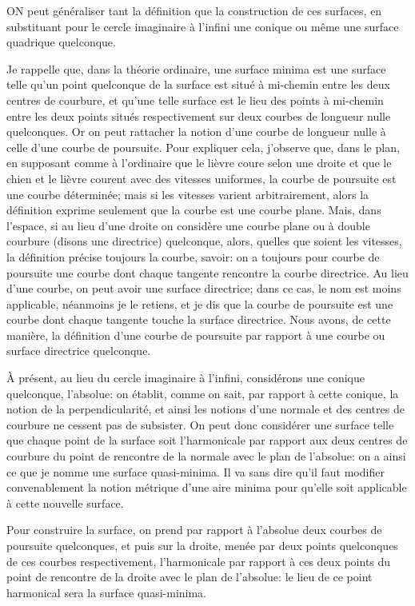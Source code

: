 \documentclass[11pt,a4paper]{article}
\begin{document}
\noindent ON peut généraliser tant la définition que la construction de ces surfaces, en substituant pour le cercle imaginaire à l'infini une conique ou même une surface quadrique quelconque.

Je rappelle que, dans la théorie ordinaire, une surface minima est une surface telle qu'un point quelconque de la surface est situé à mi-chemin entre les deux centres de courbure, et qu'une telle surface est le lieu des points à mi-chemin entre les deux points situés respectivement sur deux courbes de longueur nulle quelconques. Or on peut rattacher la notion d'une courbe de longueur nulle à celle d'une courbe de poursuite. Pour expliquer cela, j'observe que, dans le plan, en supposant comme à l'ordinaire que le lièvre coure selon une droite et que le chien et le lièvre courent avec des vitesses uniformes, la courbe de poursuite est une courbe déterminée; mais si les vitesses varient arbitrairement, alors la définition exprime seulement que la courbe est une courbe plane. Mais, dans l'espace, si au lieu d'une droite on considère une courbe plane ou à double courbure (disons une directrice) quelconque, alors, quelles que soient les vitesses, la définition précise toujours la courbe, savoir: on a toujours pour courbe de poursuite une courbe dont chaque tangente rencontre la courbe directrice. Au lieu d'une courbe, on peut avoir une surface directrice; dans ce cas, le nom est moins applicable, néanmoins je le retiens, et je dis que la courbe de poursuite est une courbe dont chaque tangente touche la surface directrice. Nous avons, de cette manière, la définition d'une courbe de poursuite par rapport à une courbe ou surface directrice quelconque.

À présent, au lieu du cercle imaginaire à l'infini, considérons une conique quelconque, l'absolue: on établit, comme on sait, par rapport à cette conique, la notion de la perpendicularité, et ainsi les notions d'une normale et des centres de courbure ne cessent pas de subsister. On peut donc considérer une surface telle que chaque point de la surface soit l'harmonicale par rapport aux deux centres de courbure du point de rencontre de la normale avec le plan de l'absolue: on a ainsi ce que je nomme une surface quasi-minima. Il va sans dire qu'il faut modifier convenablement la notion métrique d'une aire minima pour qu'elle soit applicable à cette nouvelle surface.

Pour construire la surface, on prend par rapport à l'absolue deux courbes de poursuite quelconques, et puis sur la droite, menée par deux points quelconques de ces courbes respectivement, l'harmonicale par rapport à ces deux points du point de rencontre de la droite avec le plan de l'absolue: le lieu de ce point harmonical sera la surface quasi-minima.
\end{document}
